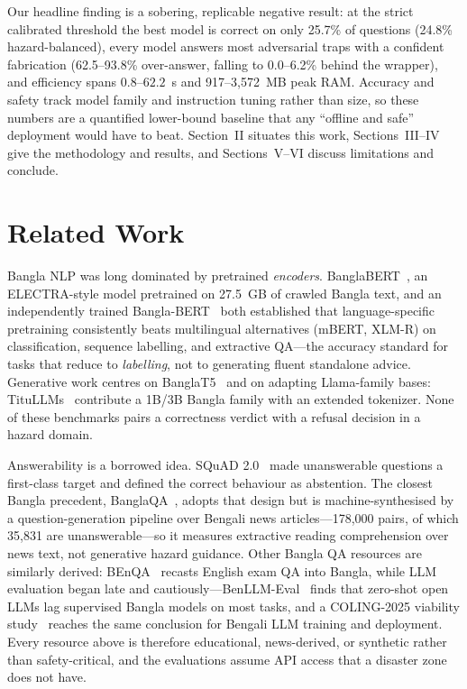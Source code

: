 \documentclass[conference]{IEEEtran}
\begin{document}
Our headline finding is a sobering, replicable negative result: at the strict calibrated threshold the best
model is correct on only 25.7\% of questions (24.8\% hazard-balanced), every model answers most adversarial
traps with a confident fabrication (62.5--93.8\% over-answer, falling to 0.0--6.2\% behind the wrapper), and
efficiency spans $0.8$--$62.2$~s and 917--3{,}572~MB peak RAM. Accuracy and safety track model family and
instruction tuning rather than size, so these numbers are a quantified lower-bound baseline that any
``offline and safe'' deployment would have to beat. Section~II situates this work,
Sections~III--IV give the methodology and results, and Sections~V--VI discuss limitations and
conclude.

\section{Related Work}
Bangla NLP was long dominated by pretrained \emph{encoders}. BanglaBERT~\cite{banglabert}, an
ELECTRA-style model pretrained on 27.5~GB of crawled Bangla text, and an independently trained
Bangla-BERT~\cite{banglabert_ieee} both established that language-specific pretraining consistently
beats multilingual alternatives (mBERT, XLM-R) on classification, sequence labelling, and extractive
QA---the accuracy standard for tasks that reduce to \emph{labelling}, not to generating fluent
standalone advice. Generative work centres on BanglaT5~\cite{banglanlg} and on adapting Llama-family
bases: TituLLMs~\cite{titullm} contribute a 1B/3B Bangla family with an extended tokenizer. None of
these benchmarks pairs a correctness verdict with a refusal decision in a hazard domain.

Answerability is a borrowed idea. SQuAD 2.0~\cite{squad2} made unanswerable questions a first-class
target and defined the correct behaviour as abstention. The closest Bangla precedent,
BanglaQA~\cite{banglaqa}, adopts that design but is machine-synthesised by a question-generation
pipeline over Bengali news articles---178{,}000 pairs, of which 35{,}831 are unanswerable---so it
measures extractive reading comprehension over news text, not generative hazard guidance. Other
Bangla QA resources are similarly derived: BEnQA~\cite{benqa} recasts English exam QA into Bangla,
while LLM evaluation began late and cautiously---BenLLM-Eval~\cite{benllm} finds that zero-shot open
LLMs lag supervised Bangla models on most tasks, and a COLING-2025 viability study~\cite{toolate}
reaches the same conclusion for Bengali LLM training and deployment. Every resource above is
therefore educational, news-derived, or synthetic rather than safety-critical, and the evaluations
assume API access that a disaster zone does not have.
\end{document}
